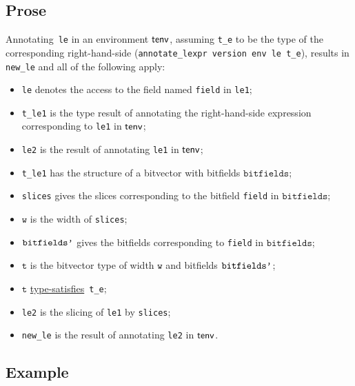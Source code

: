 \documentclass{book}
\newcommand\typesatisfies[0]{\hyperlink{def-typesatisfies}{type-satisfies}}
\newcommand\vt[0]{\texttt{t}}
\newcommand\vw[0]{\texttt{w}}
\newcommand\bitfields[0]{\texttt{bitfields}}
\begin{document}
    \subsection{Prose}
   Annotating~\texttt{le} in an environment $\textsf{tenv}$, assuming
\texttt{t\_e} to be the type of the corresponding right-hand-side
(\texttt{annotate\_lexpr version env le t\_e}), results in \texttt{new\_le} and
all of the following apply:
   \begin{itemize}
   \item \texttt{le} denotes the access to the field named \texttt{field} in \texttt{le1};
   \item \texttt{t\_le1} is the type result of annotating the right-hand-side expression corresponding to \texttt{le1} in $\textsf{tenv}$;
   \item \texttt{le2} is the result of annotating \texttt{le1} in $\textsf{tenv}$;
   \item \texttt{t\_le1} has the structure of a bitvector with bitfields $\bitfields$;
   \item \texttt{slices} gives the slices corresponding to the bitfield \texttt{field} in
      $\bitfields$;
   \item $\vw$ is the width of \texttt{slices};
   \item $\texttt{bitfields'}$ gives the bitfields corresponding to \texttt{field} in $\bitfields$;
   \item $\vt$ is the bitvector type of width $\vw$ and bitfields $\texttt{bitfields'}$;
   \item $\vt$ \typesatisfies\  \texttt{t\_e};
   \item \texttt{le2} is the slicing of \texttt{le1} by \texttt{slices};
   \item \texttt{new\_le} is the result of annotating \texttt{le2} in $\textsf{tenv}$.
   \end{itemize}

  \subsection{Example}


\end{document}
